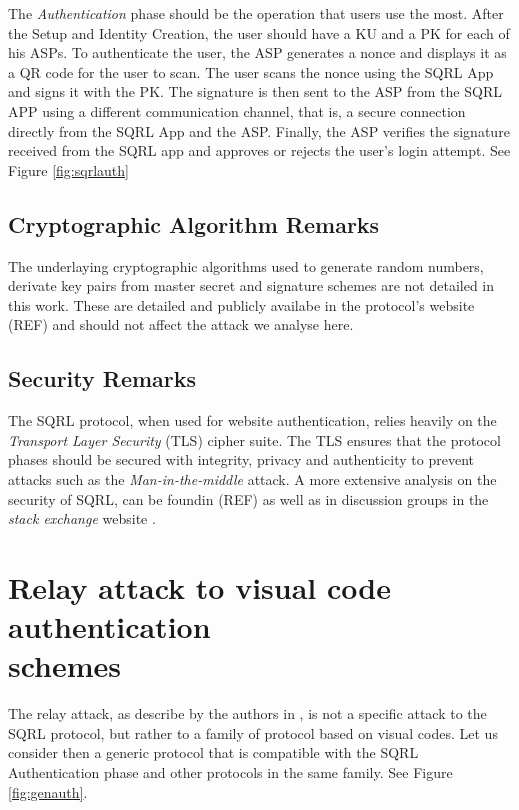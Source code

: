 \documentclass{article}
\begin{document}
	The \emph{Authentication} phase should be the operation that users use the
	most. After the Setup and Identity Creation, the user should have a KU and
	a PK for each of his ASPs. To authenticate the user, the ASP generates a 
	nonce and displays it as a QR code for the user to scan. The user scans the
	nonce using the SQRL App and signs it with the PK. The signature is then
	sent to the ASP from the SQRL APP using a different communication channel,
	that is, a secure connection directly from the SQRL App and the ASP.
	Finally, the ASP verifies the signature received from the SQRL app and 
	approves or rejects the user's login attempt. See Figure \ref{fig:sqrlauth}

	

\subsection{Cryptographic Algorithm Remarks}
	The underlaying cryptographic algorithms used to generate random numbers, derivate
	key pairs from master secret and signature schemes are not detailed in this work.
	These are detailed and publicly availabe in the protocol's website (REF) and should not
	affect the attack we analyse here. 

\subsection{Security Remarks}
	The SQRL protocol, when used for website authentication, relies heavily on
	the \emph{Transport Layer Security} (TLS) cipher suite. The TLS ensures that
	the protocol phases should be secured with integrity, privacy and authenticity
	to prevent attacks such as the \emph{Man-in-the-middle} attack. A more extensive 
	analysis on the security of SQRL, can be foundin (REF) as well as in discussion 
	groups in the \emph{stack exchange} website \cite{sqrlreport}.


\section[Relay attack to visual code authentication schemes]{Relay attack to visual code
authentication \\ schemes}
	The relay attack, as describe by the authors in \cite{relayattack}, is not a specific
	attack to the SQRL protocol, but rather to a family of protocol based on
	visual codes. Let us consider then a generic protocol that is compatible
	with the SQRL Authentication phase and other protocols in the same family.
	See Figure \ref{fig:genauth}.
\end{document}
